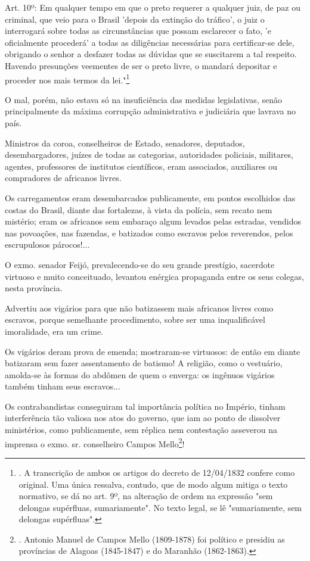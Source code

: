 Art. 10º: Em qualquer tempo em que o preto requerer a qualquer juiz, de
paz ou criminal, que veio para o Brasil 'depois da extinção do tráfico',
o juiz o interrogará sobre todas as circunstâncias que possam esclarecer
o fato, 'e oficialmente procederá' a todas as diligências necessárias
para certificar-se dele, obrigando o senhor a desfazer todas as dúvidas
que se suscitarem a tal respeito. Havendo presunções veementes de ser o
preto livre, o mandará depositar e proceder nos mais termos da
lei."\footnote{. A transcrição de ambos os artigos do decreto de
  12/04/1832 confere como original. Uma única ressalva, contudo, que de
  modo algum mitiga o texto normativo, se dá no art. 9º, na alteração de
  ordem na expressão "sem delongas supérfluas, sumariamente". No texto
  legal, se lê "sumariamente, sem delongas supérfluas".}

O mal, porém, não estava só na insuficiência das medidas legislativas,
senão principalmente da máxima corrupção administrativa e judiciária que
lavrava no país.

Ministros da coroa, conselheiros de Estado, senadores, deputados,
desembargadores, juízes de todas as categorias, autoridades policiais,
militares, agentes, professores de institutos científicos, eram
associados, auxiliares ou compradores de africanos livres.

Os carregamentos eram desembarcados publicamente, em pontos escolhidos
das costas do Brasil, diante das fortalezas, à vista da polícia, sem
recato nem mistério; eram os africanos sem embaraço algum levados pelas
estradas, vendidos nas povoações, nas fazendas, e batizados como
escravos pelos reverendos, pelos escrupulosos párocos!...

O exmo. senador Feijó, prevalecendo-se do seu grande prestígio,
sacerdote virtuoso e muito conceituado, levantou enérgica propaganda
entre os seus colegas, nesta província.

Advertiu aos vigários para que não batizassem mais africanos livres como
escravos, porque semelhante procedimento, sobre ser uma inqualificável
imoralidade, era um crime.

Os vigários deram prova de emenda; mostraram-se virtuosos: de então em
diante batizaram sem fazer assentamento de batismo! A religião, como o
vestuário, amolda-se às formas do abdômen de quem o enverga: os ingênuos
vigários também tinham seus escravos...

Os contrabandistas conseguiram tal importância política no Império,
tinham interferência tão valiosa nos atos do governo, que iam ao ponto
de dissolver ministérios, como publicamente, sem réplica nem contestação
asseverou na imprensa o exmo. sr. conselheiro Campos Mello\footnote{.
  Antonio Manuel de Campos Mello (1809-1878) foi político e presidiu as
  províncias de Alagoas (1845-1847) e do Maranhão (1862-1863).}!

